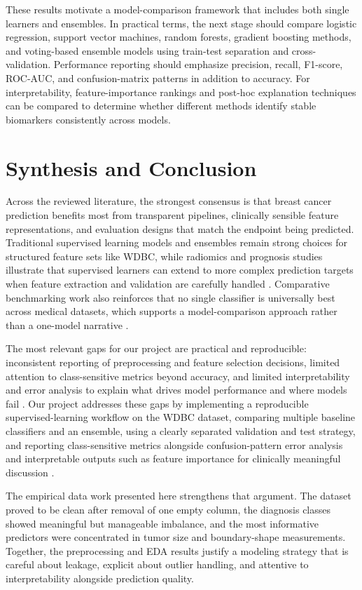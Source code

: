 \documentclass[conference]{IEEEtran}
\begin{document}
These results motivate a model-comparison framework that includes both single learners and ensembles. In practical terms, the next stage should compare logistic regression, support vector machines, random forests, gradient boosting methods, and voting-based ensemble models using train-test separation and cross-validation. Performance reporting should emphasize precision, recall, F1-score, ROC-AUC, and confusion-matrix patterns in addition to accuracy. For interpretability, feature-importance rankings and post-hoc explanation techniques can be compared to determine whether different methods identify stable biomarkers consistently across models.

\section{Synthesis and Conclusion}
Across the reviewed literature, the strongest consensus is that breast cancer prediction benefits most from transparent pipelines, clinically sensible feature representations, and evaluation designs that match the endpoint being predicted. Traditional supervised learning models and ensembles remain strong choices for structured feature sets like WDBC, while radiomics and prognosis studies illustrate that supervised learners can extend to more complex prediction targets when feature extraction and validation are carefully handled \cite{b11,b18,b14,b15}. Comparative benchmarking work also reinforces that no single classifier is universally best across medical datasets, which supports a model-comparison approach rather than a one-model narrative \cite{b10}.

The most relevant gaps for our project are practical and reproducible: inconsistent reporting of preprocessing and feature selection decisions, limited attention to class-sensitive metrics beyond accuracy, and limited interpretability and error analysis to explain what drives model performance and where models fail \cite{b7,b8}. Our project addresses these gaps by implementing a reproducible supervised-learning workflow on the WDBC dataset, comparing multiple baseline classifiers and an ensemble, using a clearly separated validation and test strategy, and reporting class-sensitive metrics alongside confusion-pattern error analysis and interpretable outputs such as feature importance for clinically meaningful discussion \cite{b12,b11,b18}. 

The empirical data work presented here strengthens that argument. The dataset proved to be clean after removal of one empty column, the diagnosis classes showed meaningful but manageable imbalance, and the most informative predictors were concentrated in tumor size and boundary-shape measurements. Together, the preprocessing and EDA results justify a modeling strategy that is careful about leakage, explicit about outlier handling, and attentive to interpretability alongside prediction quality.
\end{document}
